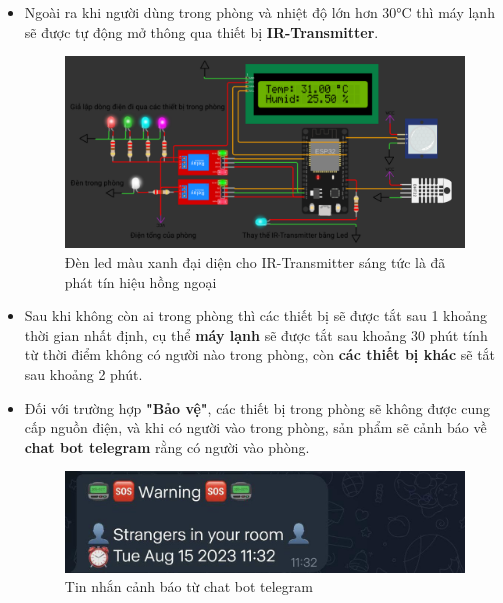 \documentclass{report}
\begin{document}
\begin{itemize}
    \pagebreak
    \item Ngoài ra khi người dùng trong phòng và nhiệt độ lớn hơn 30°C thì máy lạnh sẽ được tự động mở thông qua thiết bị \textbf{IR-Transmitter}.

    \begin{figure}[!h]
        \centering
        \includegraphics[width=\textwidth, keepaspectratio]{img/mlanh_mo.png}
        \caption{Đèn led màu xanh đại diện cho IR-Transmitter sáng tức là đã phát tín hiệu hồng ngoại}
    \end{figure}

    \item Sau khi không còn ai trong phòng thì các thiết bị sẽ được tắt sau 1 khoảng thời gian nhất định, cụ thể  \textbf{máy lạnh} sẽ được tắt sau khoảng 30 phút tính từ thời điểm không có người nào trong phòng, còn \textbf{các thiết bị khác} sẽ tắt sau khoảng 2 phút.

    \item Đối với trường hợp \textbf{"Bảo vệ"}, các thiết bị trong phòng sẽ không được cung cấp nguồn điện, và khi có người vào trong phòng, sản phẩm sẽ cảnh báo về \textbf{chat bot telegram} rằng có người vào phòng.
    \begin{figure}[H]
        \includegraphics[width=\textwidth, keepaspectratio]{img/warning.jpg}
        \centering
        \caption{Tin nhắn cảnh báo từ chat bot telegram}
    \end{figure}
    


\end{itemize}
\end{document}
